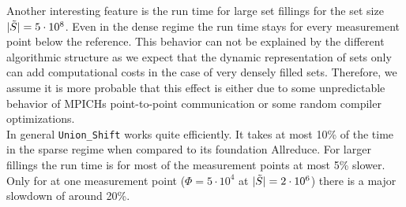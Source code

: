 Another interesting feature is the run time for large set fillings for the set size $|\Tilde{S}|= 5\cdot10^8$. Even in the dense regime the run time stays for every measurement point below the reference. This behavior can not be explained by the different algorithmic structure as we expect that the dynamic representation of sets only can add computational costs in the case of very densely filled sets. Therefore, we assume it is more probable that this effect is either due to some unpredictable behavior of MPICHs point-to-point communication or some random compiler optimizations.\\
In general \texttt{Union\_Shift} works quite efficiently. It takes at most 10\% of the time in the sparse regime when compared to its foundation Allreduce. For larger fillings the run time is for most of the measurement points at most 5\% slower. Only for at one measurement point ($\Phi=5\cdot 10^4$ at $|\Tilde{S}|=2\cdot10^6$) there is a major slowdown of around 20\%.

